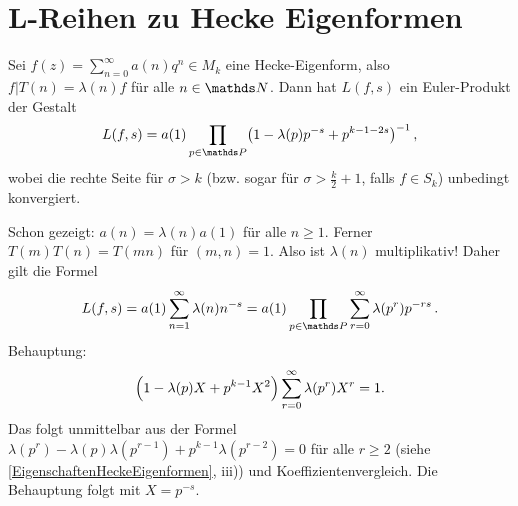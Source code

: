 \section{L-Reihen zu Hecke Eigenformen}

\begin{satz}
	Sei $f(z) = \sum_{n=0}^\infty a(n)q^n \in M_k$ eine Hecke-Eigenform, also $f|T(n) = \lambda(n)f$ für alle $n \in \NN$. Dann hat $L(f, s)$ ein Euler-Produkt der Gestalt 
	\[
		L(f,s) = a(1) \prod_{p \in \PP} \bigl(1 - \lambda(p)p^{-s} + p^{k-1-2s}\bigr)^{-1}
		\,,
	\]
	wobei die rechte Seite für $\sigma > k$ (bzw. sogar für $\sigma > \frac{k}{2} + 1$, falls $f \in S_k$) unbedingt konvergiert.
\end{satz}


\begin{bewe}
	Schon gezeigt: $a(n) = \lambda(n)a(1)$ für alle $n \geq 1$. Ferner $T(m)T(n) = T(mn)$ für $(m,n) = 1$. Also ist $\lambda(n)$ multiplikativ! Daher gilt die Formel 
	\[
	L(f,s) = a(1)\sum_{n=1}^\infty \lambda(n)n^{-s} = a(1) \prod_{p \in \PP} \sum_{r=0}^\infty \lambda(p^r)p^{-rs}
	\,.
	\]
	Behauptung: 
	\[
		\Bigl(1 - \lambda(p)X + p^{k-1}X^2\Bigr) \sum_{r=0}^\infty \lambda(p^r) X^r = 1.
	\]
	Das folgt unmittelbar aus der Formel $\lambda(p^r) - \lambda(p)\lambda(p^{r-1}) + p^{k-1}\lambda(p^{r-2}) = 0$ für alle $r \geq 2$ (siehe \autoref{EigenschaftenHeckeEigenformen}, iii)) und Koeffizientenvergleich. Die Behauptung folgt mit $X = p^{-s}$.
\end{bewe}